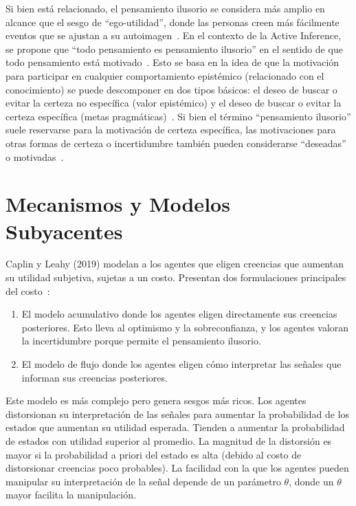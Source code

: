 \documentclass[12pt, a4paper, twoside]{article}
\begin{document}
Si bien está relacionado, el pensamiento ilusorio se considera más amplio en alcance que el sesgo de ``ego-utilidad'', donde las personas creen más fácilmente 
eventos que se ajustan a su autoimagen~\cite{mayraz2011wishful}.
En el contexto de la Active Inference, se propone que ``todo pensamiento es pensamiento ilusorio'' en el sentido de que todo pensamiento está motivado~\cite{kruglanski2020all}. 
Esto se basa en la idea de que la motivación para participar en cualquier comportamiento epistémico (relacionado con el conocimiento) se puede descomponer en 
dos tipos básicos: el deseo de buscar o evitar la certeza no específica (valor epistémico) y el deseo de buscar o evitar la certeza específica 
(metas pragmáticas)~\cite{kruglanski2020all}. Si bien el término ``pensamiento ilusorio'' suele reservarse para la motivación de certeza específica, 
las motivaciones para otras formas de certeza o incertidumbre también pueden considerarse ``deseadas'' o motivadas~\cite{kruglanski2020all}.

\section{Mecanismos y Modelos Subyacentes}

Caplin y Leahy (2019) modelan a los agentes que eligen creencias que aumentan su utilidad subjetiva, sujetas a un costo. Presentan dos formulaciones 
principales del costo~\cite{caplin2019wishful}:

\begin{enumerate}
    \item El modelo acumulativo donde los agentes eligen directamente sus creencias posteriores. Esto lleva al optimismo y la sobreconfianza, 
    y los agentes valoran la incertidumbre porque permite el pensamiento ilusorio.
    \item El modelo de flujo donde los agentes eligen cómo interpretar las señales que informan sus creencias posteriores. 
\end{enumerate}


Este modelo es más complejo pero genera sesgos más ricos. Los agentes distorsionan su interpretación de las señales para aumentar la probabilidad de los estados
que aumentan su utilidad esperada. Tienden a aumentar la probabilidad de estados con utilidad superior al promedio. La magnitud de la distorsión es mayor si la 
probabilidad a priori del estado es alta (debido al costo de distorsionar creencias poco probables). La facilidad con la que los agentes pueden manipular su 
interpretación de la señal depende de un parámetro $\theta$, donde un $\theta$ mayor facilita la manipulación.
\end{document}
